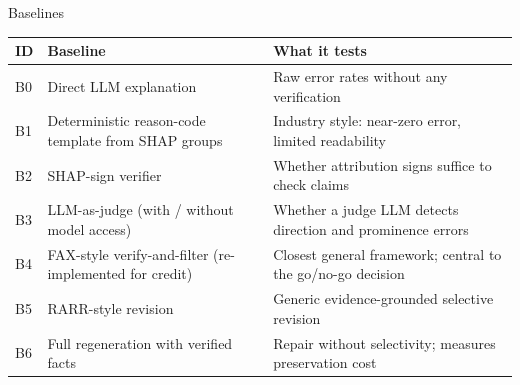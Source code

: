 \documentclass[aspectratio=169,10pt]{beamer}
\begin{document}
\begin{frame}{Baselines}
  \vspace{0.5ex}
  \small
  \renewcommand{\arraystretch}{1.35}
  \begin{tabularx}{\textwidth}{@{}l L{4.7cm} Y@{}}
    \textbf{\color{vrblue}ID} & \textbf{\color{vrblue}Baseline} & \textbf{\color{vrblue}What it tests}\\\hline
    B0 & Direct LLM explanation & Raw error rates without any verification\\
    B1 & Deterministic reason-code template from SHAP groups & Industry style: near-zero error, limited readability\\
    B2 & SHAP-sign verifier & Whether attribution signs suffice to check claims\\
    B3 & LLM-as-judge (with / without model access) & Whether a judge LLM detects direction and prominence errors\\
    B4 & FAX-style verify-and-filter (re-implemented for credit) & Closest general framework; central to the go/no-go decision\\
    B5 & RARR-style revision & Generic evidence-grounded selective revision\\
    B6 & Full regeneration with verified facts & Repair without selectivity; measures preservation cost
  \end{tabularx}
\end{frame}
\end{document}
